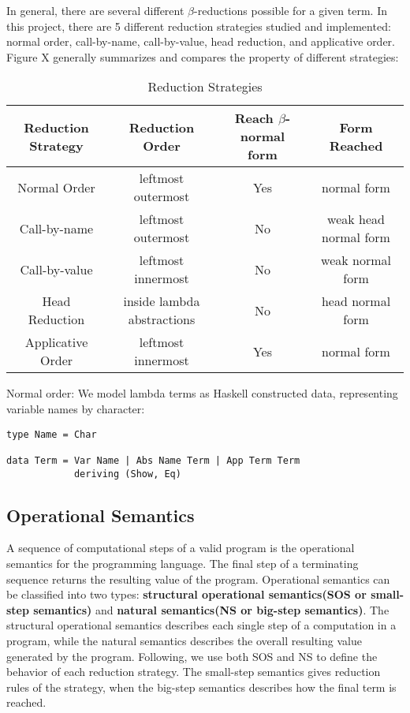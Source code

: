 In general, there are several different $\beta$-reductions possible for a given term. In this project, there are 5 different reduction strategies studied and implemented: normal order, call-by-name, call-by-value, head reduction, and applicative order. Figure X generally summarizes and compares the property of different strategies:
 
\begin{center}
\begin{table}[ht!]
\begin{tabular}{|c|c|c|c|}\hline
Reduction Strategy & Reduction Order & Reach $\beta$-normal form & Form Reached\\ \hline
Normal Order & leftmost outermost & Yes & normal form\\ \hline
Call-by-name & leftmost outermost & No  & weak head normal form\\ \hline
Call-by-value & leftmost innermost & No & weak normal form\\ \hline
Head Reduction & inside lambda abstractions & No & head normal form\\ \hline
Applicative Order & leftmost innermost & Yes & normal form\\ \hline
\end{tabular}
\caption{Reduction Strategies}
\end{table}
\end{center}
Normal order:
We model lambda terms as Haskell constructed data, representing variable names by character:

\begin{verbatim}
type Name = Char  

data Term = Var Name | Abs Name Term | App Term Term
            deriving (Show, Eq)
\end{verbatim}


\subsection*{Operational Semantics}

A sequence of computational steps of a valid program is the operational semantics for the programming language. The final step of a terminating sequence returns the resulting value of the program. Operational semantics can be classified into two types: \textbf{structural operational semantics(SOS or small-step semantics)} and \textbf{natural semantics(NS or big-step semantics)}. The structural operational semantics describes each single step of a computation in a program, while the natural semantics describes the overall resulting value generated by the program. Following, we use both SOS and NS to define the behavior of each reduction strategy. The small-step semantics gives reduction rules of the strategy, when the big-step semantics describes how the final term is reached.  

